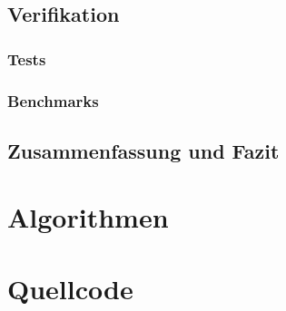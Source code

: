 \documentclass[a4paper,12pt,oneside,german,toc=bibliography]{scrbook}
\theoremstyle{definition}
\theoremstyle{plain}
\numberwithin{equation}{section}
\begin{document}

\section{Verifikation}
    \subsection{Tests}     
    \subsection{Benchmarks}


\section{Zusammenfassung und Fazit}




\appendix


\chapter{Algorithmen}


\chapter{Quellcode}





\end{document}
